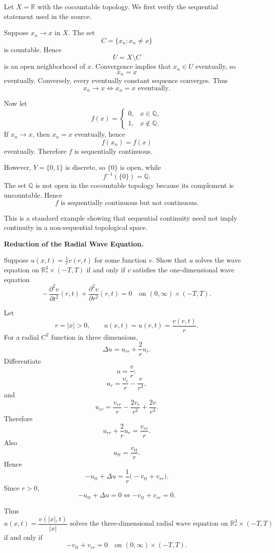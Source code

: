 \begin{solution}
Let \(X=\mathbb R\) with the cocountable topology. We first verify the sequential statement used
in the source.

Suppose \(x_n\to x\) in \(X\). The set
\[
C=\{x_n:x_n\neq x\}
\]
is countable. Hence
\[
U=X\setminus C
\]
is an open neighborhood of \(x\). Convergence implies that \(x_n\in U\) eventually, so
\[
x_n=x
\]
eventually. Conversely, every eventually constant sequence converges. Thus
\[
\boxed{x_n\to x\iff x_n=x\text{ eventually}.}
\]

Now let
\[
f(x)=
\begin{cases}
0,&x\in\mathbb Q,\\
1,&x\notin\mathbb Q.
\end{cases}
\]
If \(x_n\to x\), then \(x_n=x\) eventually, hence
\[
f(x_n)=f(x)
\]
eventually. Therefore \(f\) is sequentially continuous.

However, \(Y=\{0,1\}\) is discrete, so \(\{0\}\) is open, while
\[
f^{-1}(\{0\})=\mathbb Q.
\]
The set \(\mathbb Q\) is not open in the cocountable topology because its complement is
uncountable. Hence
\[
\boxed{
f\text{ is sequentially continuous but not continuous}.
}
\]

This is a standard example showing that sequential continuity need not imply continuity in a
non-sequential topological space.
\end{solution}


\begin{problem}[CP-II-0150]
\label{prob:cp-ii-0150}
\textbf{Reduction of the Radial Wave Equation.}

\hspace*{1.5em}Suppose $u(x,t) = \frac{1}{r}v(r,t)$ for some function $v$.
	Show that $u$ solves the wave equation on $\mathbb{R}^3_*\times(-T,T)$
	if and only if $v$ satisfies the one-dimensional wave equation
	\[
	-\,\frac{\partial^2 v}{\partial t^2}(r,t)
	+ \frac{\partial^2 v}{\partial r^2}(r,t)
	= 0
	\quad\text{on } (0,\infty)\times(-T,T).
	\]
\end{problem}

\begin{solution}
Let
\[
r=|x|>0,
\qquad
u(x,t)=u(r,t)=\frac{v(r,t)}{r}.
\]
For a radial \(C^2\) function in three dimensions,
\[
\Delta u=u_{rr}+\frac2r u_r.
\]
Differentiate
\[
u=\frac vr:
\]
\[
u_r=\frac{v_r}{r}-\frac{v}{r^2},
\]
and
\[
u_{rr}
=
\frac{v_{rr}}r-\frac{2v_r}{r^2}+\frac{2v}{r^3}.
\]
Therefore
\[
u_{rr}+\frac2r u_r
=
\frac{v_{rr}}r.
\]
Also
\[
u_{tt}=\frac{v_{tt}}r.
\]
Hence
\[
-u_{tt}+\Delta u
=
\frac1r\bigl(-v_{tt}+v_{rr}\bigr).
\]
Since \(r>0\),
\[
-u_{tt}+\Delta u=0
\iff
-v_{tt}+v_{rr}=0.
\]

Thus
\[
\boxed{
u(x,t)=\frac{v(|x|,t)}{|x|}
\text{ solves the three-dimensional radial wave equation on }
\mathbb R^3_*\times(-T,T)
}
\]
if and only if
\[
\boxed{
-v_{tt}+v_{rr}=0
\quad\text{on }(0,\infty)\times(-T,T).
}
\]
\end{solution}


